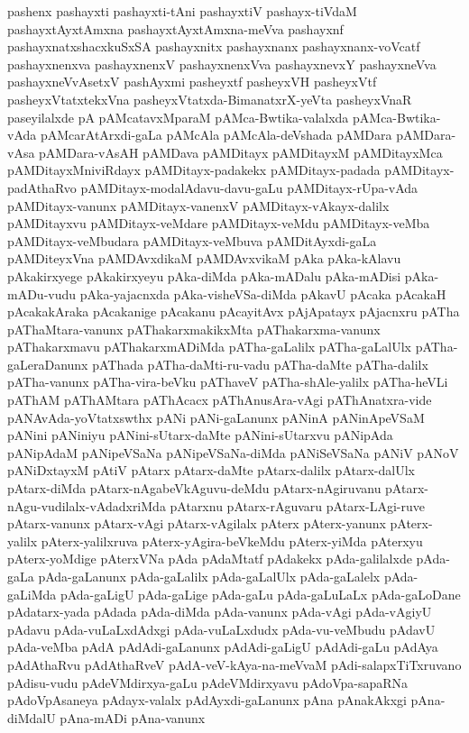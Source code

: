 {pashenx
pashayxti
pashayxti-tAni
pashayxtiV
pashayx-tiVdaM
pashayxtAyxtAmxna
pashayxtAyxtAmxna-meVva
pashayxnf
pashayxnatxshacxkuSxSA
pashayxnitx
pashayxnanx
pashayxnanx-voVcatf
pashayxnenxva
pashayxnenxV
pashayxnenxVva
pashayxnevxY
pashayxneVva
pashayxneVvAsetxV
pashAyxmi
pasheyxtf
pasheyxVH
pasheyxVtf
pasheyxVtatxtekxVna
pasheyxVtatxda-BimanatxrX-yeVta
pasheyxVnaR
paseyilalxde
pA
pAMcatavxMparaM
pAMca-Bwtika-valalxda
pAMca-Bwtika-vAda
pAMcarAtArxdi-gaLa
pAMcAla
pAMcAla-deVshada
pAMDara
pAMDara-vAsa
pAMDara-vAsAH
pAMDava
pAMDitayx
pAMDitayxM
pAMDitayxMca
pAMDitayxMniviRdayx
pAMDitayx-padakekx
pAMDitayx-padada
pAMDitayx-padAthaRvo
pAMDitayx-modalAdavu-davu-gaLu
pAMDitayx-rUpa-vAda
pAMDitayx-vanunx
pAMDitayx-vanenxV
pAMDitayx-vAkayx-dalilx
pAMDitayxvu
pAMDitayx-veMdare
pAMDitayx-veMdu
pAMDitayx-veMba
pAMDitayx-veMbudara
pAMDitayx-veMbuva
pAMDitAyxdi-gaLa
pAMDiteyxVna
pAMDAvxdikaM
pAMDAvxvikaM
pAka
pAka-kAlavu
pAkakirxyege
pAkakirxyeyu
pAka-diMda
pAka-mADalu
pAka-mADisi
pAka-mADu-vudu
pAka-yajacnxda
pAka-visheVSa-diMda
pAkavU
pAcaka
pAcakaH
pAcakakAraka
pAcakanige
pAcakanu
pAcayitAvx
pAjApatayx
pAjacnxru
pATha
pAThaMtara-vanunx
pAThakarxmakikxMta
pAThakarxma-vanunx
pAThakarxmavu
pAThakarxmADiMda
pATha-gaLalilx
pATha-gaLalUlx
pATha-gaLeraDanunx
pAThada
pATha-daMti-ru-vadu
pATha-daMte
pATha-dalilx
pATha-vanunx
pATha-vira-beVku
pAThaveV
pATha-shAle-yalilx
pATha-heVLi
pAThAM
pAThAMtara
pAThAcacx
pAThAnusAra-vAgi
pAThAnatxra-vide
pANAvAda-yoVtatxswthx
pANi
pANi-gaLanunx
pANinA
pANinApeVSaM
pANini
pANiniyu
pANini-sUtarx-daMte
pANini-sUtarxvu
pANipAda
pANipAdaM
pANipeVSaNa
pANipeVSaNa-diMda
pANiSeVSaNa
pANiV
pANoV
pANiDxtayxM
pAtiV
pAtarx
pAtarx-daMte
pAtarx-dalilx
pAtarx-dalUlx
pAtarx-diMda
pAtarx-nAgabeVkAguvu-deMdu
pAtarx-nAgiruvanu
pAtarx-nAgu-vudilalx-vAdadxriMda
pAtarxnu
pAtarx-rAguvaru
pAtarx-LAgi-ruve
pAtarx-vanunx
pAtarx-vAgi
pAtarx-vAgilalx
pAterx
pAterx-yanunx
pAterx-yalilx
pAterx-yalilxruva
pAterx-yAgira-beVkeMdu
pAterx-yiMda
pAterxyu
pAterx-yoMdige
pAterxVNa
pAda
pAdaMtatf
pAdakekx
pAda-galilalxde
pAda-gaLa
pAda-gaLanunx
pAda-gaLalilx
pAda-gaLalUlx
pAda-gaLalelx
pAda-gaLiMda
pAda-gaLigU
pAda-gaLige
pAda-gaLu
pAda-gaLuLaLx
pAda-gaLoDane
pAdatarx-yada
pAdada
pAda-diMda
pAda-vanunx
pAda-vAgi
pAda-vAgiyU
pAdavu
pAda-vuLaLxdAdxgi
pAda-vuLaLxdudx
pAda-vu-veMbudu
pAdavU
pAda-veMba
pAdA
pAdAdi-gaLanunx
pAdAdi-gaLigU
pAdAdi-gaLu
pAdAya
pAdAthaRvu
pAdAthaRveV
pAdA-veV-kAya-na-meVvaM
pAdi-salapxTiTxruvano
pAdisu-vudu
pAdeVMdirxya-gaLu
pAdeVMdirxyavu
pAdoVpa-sapaRNa
pAdoVpAsaneya
pAdayx-valalx
pAdAyxdi-gaLanunx
pAna
pAnakAkxgi
pAna-diMdalU
pAna-mADi
pAna-vanunx
}
